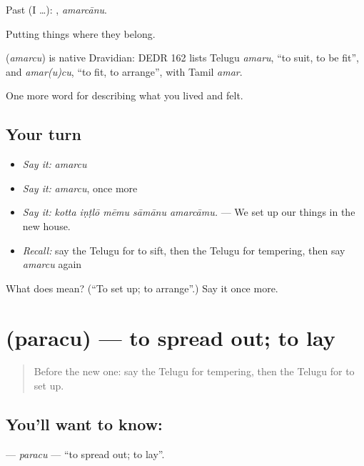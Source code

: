 Past (I …): , \emph{amarcānu}.

Putting things where they belong.

\begin{cousinweb}
\textbf{} (\emph{amarcu}) is native Dravidian: DEDR 162 lists Telugu \emph{amaru}, \textquotedblleft{}to suit, to be fit\textquotedblright{}, and \emph{amar(u)cu}, \textquotedblleft{}to fit, to arrange\textquotedblright{}, with Tamil \emph{amar}.
\end{cousinweb}

\begin{grammarlens}[title={What you've built}]
One more word for describing what you lived and felt.
\end{grammarlens}

\subsection*{Your turn}
\begin{itemize}
\raggedright
  \item \emph{Say it:} \emph{amarcu}
  \item \emph{Say it:} \emph{amarcu}, once more
  \item \emph{Say it:} \emph{kotta iṇṭlō mēmu sāmānu amarcāmu.} — We set up our things in the new house.
  \item \emph{Recall:} say the Telugu for to sift, then the Telugu for tempering, then say \emph{amarcu} again
\end{itemize}

\begin{tcolorbox}[breakable,colback=teal!4,colframe=teal!35!black,title={Before you move on}]
What does  mean? (\textquotedblleft{}To set up; to arrange\textquotedblright{}.) Say it once more.
\end{tcolorbox}
\section[\texorpdfstring{\te{పరచు} (paracu)}{పరచు (paracu)}]{ (paracu) — to spread out; to lay}

\label{lesson:TE-C549-paracu}



\begin{quote}
Before the new one: say the Telugu for tempering, then the Telugu for to set up.
\end{quote}

\subsection*{You'll want to know: }
\textbf{} — \emph{paracu} — \textquotedblleft{}to spread out; to lay\textquotedblright{}.

